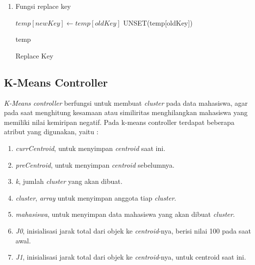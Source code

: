 \begin{enumerate}
    \item Fungsi replace key
        \begin{algorithm}[H]
            \begin{algorithmic}[1]
                    \State $temp[newKey] \gets temp[oldKey]$
                    \State UNSET(temp[oldKey])
                    
                    \State \Return temp
                \EndProcedure
            \end{algorithmic} 
            \caption{Replace Key}
            \label{alg:Replace Key siswa controller}
        \end{algorithm}
\end{enumerate}

\subsection{K-Means Controller}
\label{subsec:kmeans}

\textit{K-Means controller} berfungsi untuk membuat \textit{cluster} pada data mahasiswa, agar pada saat menghitung kesamaan atau similiritas menghilangkan mahasiswa yang memiliki nilai kemiripan negatif. Pada k-means controller terdapat beberapa atribut yang digunakan, yaitu : 
\begin{enumerate}
    \item \textit{currCentroid}, untuk menyimpan \textit{centroid} saat ini.
    
    \item \textit{preCentroid}, untuk menyimpan \textit{centroid} sebelumnya.
    
    \item \textit{k}, jumlah \textit{cluster} yang akan dibuat.
    
    \item \textit{cluster}, \textit{array} untuk menyimpan anggota tiap \textit{cluster}.
    
    \item \textit{mahasiswa}, untuk menyimpan data mahasiswa yang akan dibuat \textit{cluster}.
    
    \item \textit{J0}, inisialisasi jarak total dari objek ke \textit{centroid}-nya, berisi nilai 100 pada saat awal.
    
    \item \textit{J1}, inisialisasi jarak total dari objek ke \textit{centroid}-nya, untuk centroid saat ini.
\end{enumerate}

